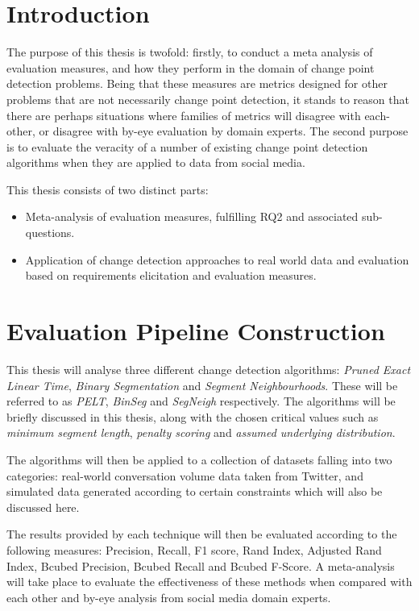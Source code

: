 \documentclass[../main.tex]{subfiles}
\begin{document}
\section{Introduction}

The purpose of this thesis is twofold: firstly, to conduct a meta analysis of evaluation measures, and how they perform in the domain of change point detection problems. Being that these measures are metrics designed for other problems that are not necessarily change point detection, it stands to reason that there are perhaps situations where families of metrics will disagree with each-other, or disagree with by-eye evaluation by domain experts. The second purpose is to evaluate the veracity of a number of existing change point detection algorithms when they are applied to data from social media.

This thesis consists of two distinct parts:

\begin{itemize}
  \item Meta-analysis of evaluation measures, fulfilling RQ2 and associated sub-questions.
  \item Application of change detection approaches to real world data and evaluation based on requirements elicitation and evaluation measures.
\end{itemize}

\section{Evaluation Pipeline Construction}

This thesis will analyse three different change detection algorithms: \emph{Pruned Exact Linear Time}\cite{Killick2011a}, \emph{Binary Segmentation} \cite{Jackson2003} and \emph{Segment Neighbourhoods}\cite{Auger1989}. These will be referred to as \emph{PELT}, \emph{BinSeg} and \emph{SegNeigh} respectively. The algorithms will be briefly discussed in this thesis, along with the chosen critical values such as \emph{minimum segment length}, \emph{penalty scoring} and \emph{assumed underlying distribution}.

The algorithms will then be applied to a collection of datasets falling into two categories: real-world conversation volume data taken from Twitter, and simulated data generated according to certain constraints which will also be discussed here.

The results provided by each technique will then be evaluated according to the following measures: Precision, Recall, F1 score, Rand Index, Adjusted Rand Index, Bcubed Precision, Bcubed Recall and Bcubed F-Score. A meta-analysis will take place to evaluate the effectiveness of these methods when compared with each other and by-eye analysis from social media domain experts.
\end{document}
